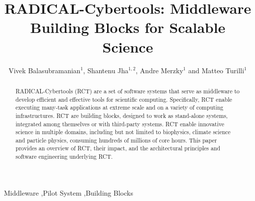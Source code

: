 \documentclass[preprint,12pt, a4paper]{elsarticle}
\begin{document}
\begin{frontmatter}

\title{RADICAL-Cybertools: Middleware Building Blocks for Scalable Science}

\author{Vivek Balasubramanian$^1$, Shantenu Jha$^{1,2}$, Andre Merzky$^1$ and Matteo Turilli$^1$}
\address{$^1$Electrical \& Computer Engineering, Rutgers University, Piscataway, NJ 08854, USA, $^2$Brookhaven National Laboratory}

\begin{abstract}
RADICAL-Cybertools (RCT) are a set of software systems that serve as
middleware to develop efficient and effective tools for scientific computing.
Specifically, RCT enable executing many-task applications at extreme scale
and on a variety of computing infrastructures. RCT are building blocks,
designed to work as stand-alone systems, integrated among themselves or with
third-party systems. RCT enable innovative science in multiple domains,
including but not limited to biophysics, climate science and particle
physics, consuming hundreds of millions of core hours. This paper provides an
overview of RCT, their impact, and the architectural principles and software
engineering underlying RCT\@.
\end{abstract}

\begin{keyword}

Middleware \sep Pilot System \sep Building Blocks



\end{keyword}

\end{frontmatter}


\end{document}

